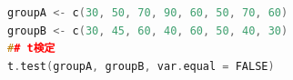 \begin{lstlisting}[language=c++,label={code:19_05},caption={帰無仮説検定のコード}]
groupA <- c(30, 50, 70, 90, 60, 50, 70, 60)
groupB <- c(30, 45, 60, 40, 60, 50, 40, 30)
## t検定
t.test(groupA, groupB, var.equal = FALSE)
\end{lstlisting}
